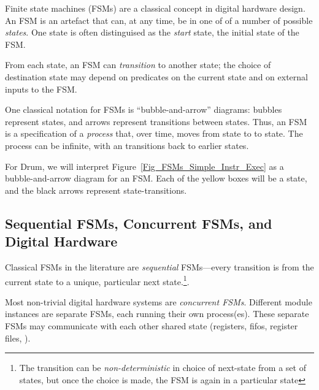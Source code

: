\label{Sec_FSMs_FSMs}


Finite state machines (FSMs) are a classical concept in digital
hardware design.  An FSM is an artefact that can, at any time, be in
one of of a number of possible \emph{states}.  One state is often
distinguised as the \emph{start} state, the initial state of the FSM.

From each state, an FSM can \emph{transition} to another state; the
choice of destination state may depend on predicates on the current
state and on external inputs to the FSM.

One classical notation for FSMs is ``bubble-and-arrow'' diagrams:
bubbles represent states, and arrows represent transitions between
states.  Thus, an FSM is a specification of a \emph{process} that,
over time, moves from state to to state.  The process can be infinite,
with an transitions back to earlier states.


For Drum, we will interpret
Figure~\ref{Fig_FSMs_Simple_Instr_Exec} as a bubble-and-arrow diagram
for an FSM.  Each of the yellow boxes will be a state, and the black
arrows represent state-transitions.


\subsection{Sequential FSMs, Concurrent FSMs, and Digital Hardware}


Classical FSMs in the literature are \emph{sequential} FSMs---every
transition is from the current state to a unique, particular next
state.\footnote{The transition can be \emph{non-deterministic} in
choice of next-state from a set of states, but once the choice is
made, the FSM is again in a particular state}.

Most non-trivial digital hardware systems are \emph{concurrent FSMs}.
Different module instances are separate FSMs, each running their own
process(es).  These separate FSMs may communicate with each other
{\via} shared state (registers, fifos, register files, {\etc}).



